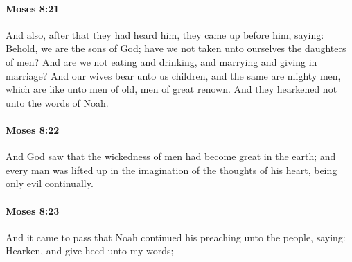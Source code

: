 		\paragraph{Moses 8:21} %
			\label{MOSES-8-21}

			And also, after that they had heard him, they came up before him, saying: Behold, we are the sons of God; have we not taken unto ourselves the daughters of men? And are we not eating and drinking, and marrying and giving in marriage? And our wives bear unto us children, and the same are mighty men, which are like unto men of old, men of great renown. And they hearkened not unto the words of Noah.


		\paragraph{Moses 8:22} %
			\label{MOSES-8-22}

			And God saw that the wickedness of men had become great in the earth; and every man was lifted up in the imagination of the thoughts of his heart, being only evil continually.


		\paragraph{Moses 8:23} %
			\label{MOSES-8-23}

			And it came to pass that Noah continued his preaching unto the people, saying: Hearken, and give heed unto my words;

